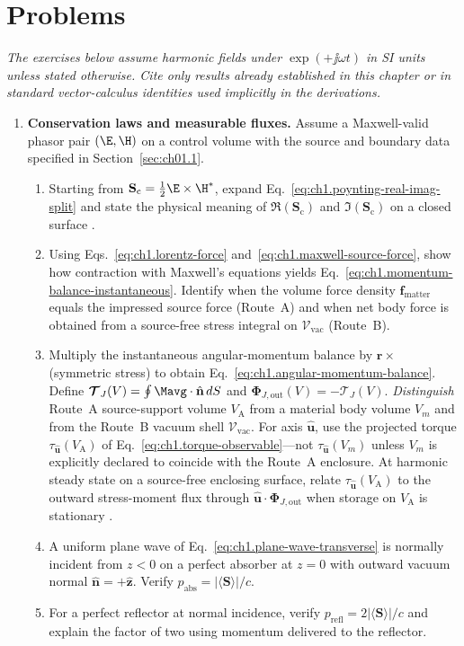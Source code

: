 \section{Problems}
\label{sec:ch01.8}

\noindent\emph{The exercises below assume harmonic fields under $\exp(+\jj\omega t)$ in SI units unless stated otherwise. Cite only results already established in this chapter or in standard vector-calculus identities used implicitly in the derivations.}

\begin{enumerate}
\item \textbf{Conservation laws and measurable fluxes.}
Assume a Maxwell-valid phasor pair $(\E,\H)$ on a control volume with the source and boundary data specified in Section~\ref{sec:ch01.1}.
\begin{enumerate}[label=(\alph*)]
\item Starting from $\mathbf{S}_\mathrm{c}=\tfrac12\E\times\H^*$, expand Eq.~\eqref{eq:ch1.poynting-real-imag-split} and state the physical meaning of $\Re(\mathbf{S}_\mathrm{c})$ and $\Im(\mathbf{S}_\mathrm{c})$ on a closed surface \cite{poynting1884,stratton1941}.
\item Using Eqs.~\eqref{eq:ch1.lorentz-force} and~\eqref{eq:ch1.maxwell-source-force}, show how contraction with Maxwell's equations yields Eq.~\eqref{eq:ch1.momentum-balance-instantaneous}. Identify when the volume force density $\mathbf{f}_{\mathrm{matter}}$ equals the impressed source force (Route~A) and when net body force is obtained from a source-free stress integral on $\mathcal{V}_{\mathrm{vac}}$ (Route~B).
\item Multiply the instantaneous angular-momentum balance by $\mathbf{r}\times$ (symmetric stress) to obtain Eq.~\eqref{eq:ch1.angular-momentum-balance}. Define $\boldsymbol{\mathcal{T}}_J(V)=\oint\Mavg\cdot\hat{\mathbf{n}}\,dS$ and $\boldsymbol{\Phi}_{J,\mathrm{out}}(V)=-\boldsymbol{\mathcal{T}}_J(V)$. \emph{Distinguish} Route~A source-support volume $V_{\mathrm{A}}$ from a material body volume $V_m$ and from the Route~B vacuum shell $\mathcal{V}_{\mathrm{vac}}$. For axis $\hat{\mathbf{u}}$, use the projected torque $\tau_{\hat{\mathbf{u}}}(V_{\mathrm{A}})$ of Eq.~\eqref{eq:ch1.torque-observable}---not $\tau_{\hat{\mathbf{u}}}(V_m)$ unless $V_m$ is explicitly declared to coincide with the Route~A enclosure. At harmonic steady state on a source-free enclosing surface, relate $\tau_{\hat{\mathbf{u}}}(V_{\mathrm{A}})$ to the outward stress-moment flux through $\hat{\mathbf{u}}\cdot\boldsymbol{\Phi}_{J,\mathrm{out}}$ when storage on $V_{\mathrm{A}}$ is stationary \cite{beth1936,stratton1941}.
\item A uniform plane wave of Eq.~\eqref{eq:ch1.plane-wave-transverse} is normally incident from $z<0$ on a perfect absorber at $z=0$ with outward vacuum normal $\hat{\mathbf{n}}=+\hat{\mathbf{z}}$. Verify $p_{\mathrm{abs}}=|\langle\mathbf{S}\rangle|/c$.
\item For a perfect reflector at normal incidence, verify $p_{\mathrm{refl}}=2|\langle\mathbf{S}\rangle|/c$ and explain the factor of two using momentum delivered to the reflector.
\end{enumerate}


\end{enumerate}
